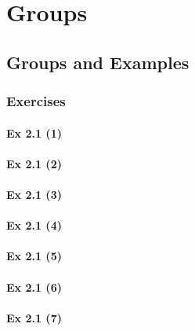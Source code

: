 \setcounter{chapter}{0}
\renewcommand{\thechapter}{2}
\chapter{Groups}\label{ch:2}
\setcounter{equation}{0}	        %

\section{Groups and Examples}\label{sec:2.1}
\subsection{Exercises}\label{sec:2.1_Exercises}

\subsubsection{Ex 2.1 (1)}\label{sec:Ex_2.1.1}

\subsubsection{Ex 2.1 (2)}\label{sec:Ex_2.1.2}

\subsubsection{Ex 2.1 (3)}\label{sec:Ex_2.1.3}

\subsubsection{Ex 2.1 (4)}\label{sec:Ex_2.1.4}

\subsubsection{Ex 2.1 (5)}\label{sec:Ex_2.1.5}

\subsubsection{Ex 2.1 (6)}\label{sec:Ex_2.1.6}

\subsubsection{Ex 2.1 (7)}\label{sec:Ex_2.1.7}

